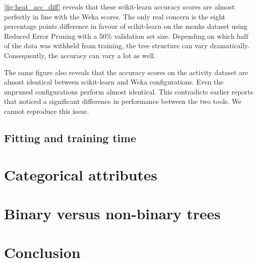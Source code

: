 \autoref{fig:heat_acc_diff} reveals that these scikit-learn accuracy scores are almost perfectly in line with the Weka scores. The only real concern is the eight percentage points difference in favour of scikit-learn on the monks dataset using Reduced Error Pruning with a 50\% validation set size. Depending on which half of the data was withheld from training, the tree structure can vary dramatically. Consequently, the accuracy can vary a lot as well.

The same figure also reveals that the accuracy scores on the activity dataset are almost identical between scikit-learn and Weka configurations. Even the unpruned configurations perform almost identical. This contradicts earlier reports that noticed a significant difference in performance between the two tools. We cannot reproduce this issue.

\subsection{Fitting and training time}

\section{Categorical attributes}

\section{Binary versus non-binary trees}

\section{Conclusion}
